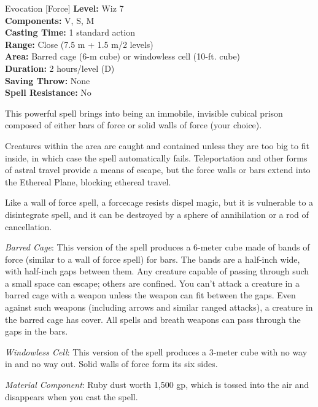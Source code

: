 {Evocation [Force]}
{
	\textbf{Level:}
	Wiz 7\\
	\textbf{Components:}
	V, S, M\\
	\textbf{Casting Time:}
	1 standard action\\
	\textbf{Range:}
	Close (7.5 m + 1.5 m/2 levels)\\
	\textbf{Area:}
	Barred cage (6-m cube) or windowless cell (10-ft. cube)\\
	\textbf{Duration:}
	2 hours/level (D)\\
	\textbf{Saving Throw:}
	None\\
	\textbf{Spell Resistance:}
	No\\
}
{
	This powerful spell brings into being an immobile, invisible cubical prison composed of either bars of force or solid walls of force (your choice).

	Creatures within the area are caught and contained unless they are too big to fit inside, in which case the spell automatically fails. Teleportation and other forms of astral travel provide a means of escape, but the force walls or bars extend into the Ethereal Plane, blocking ethereal travel.

	Like a wall of force spell, a forcecage resists dispel magic, but it is vulnerable to a disintegrate spell, and it can be destroyed by a sphere of annihilation or a rod of cancellation.

	\textit{Barred Cage}:
	This version of the spell produces a 6-meter cube made of bands of force (similar to a wall of force spell) for bars. The bands are a half-inch wide, with half-inch gaps between them. Any creature capable of passing through such a small space can escape; others are confined. You can't attack a creature in a barred cage with a weapon unless the weapon can fit between the gaps. Even against such weapons (including arrows and similar ranged attacks), a creature in the barred cage has cover. All spells and breath weapons can pass through the gaps in the bars.

	\textit{Windowless Cell}:
	This version of the spell produces a 3-meter cube with no way in and no way out. Solid walls of force form its six sides.

	\textit{Material Component}:
	Ruby dust worth 1,500 gp, which is tossed into the air and disappears when you cast the spell.

}
